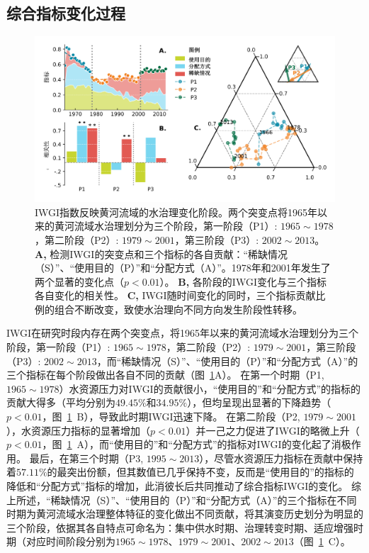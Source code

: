 \subsection{综合指标变化过程}\label{ch4:sec:process}

\begin{figure}[ht!]
	\centering
	\includegraphics[width=\textwidth]{img/ch4/ch4_index.png}
	\caption[IWGI指数反映黄河流域的水治理变化阶段]{IWGI指数反映黄河流域的水治理变化阶段。两个突变点将1965年以来的黄河流域水治理划分为三个阶段，第一阶段（P1）: $1965 \sim 1978$，第二阶段（P2）: $1979 \sim 2001$，第三阶段（P3）: $2002 \sim 2013$。
	\textbf{A,} 检测IWGI的突变点和三个指标的各自贡献：“稀缺情况（S）”、“使用目的（P）”和“分配方式（A）”。1978年和2001年发生了两个显著的变化点（$p<0.01$）。
	\textbf{B,}  各阶段的IWGI变化与三个指标各自变化的相关性。
	\textbf{C,} IWGI随时间变化的同时，三个指标贡献比例的组合不断改变，致使水治理向不同方向发生阶段性转移。
	}\label{ch4:fig:IWGI}
\end{figure}

IWGI在研究时段内存在两个突变点，将1965年以来的黄河流域水治理划分为三个阶段，第一阶段（P1）: $1965 \sim 1978$，第二阶段（P2）: $1979 \sim 2001$，第三阶段（P3）: $2002 \sim 2013$，而“稀缺情况（S）”、“使用目的（P）”和“分配方式（A）”的三个指标在每个阶段做出各自不同的贡献（图~\ref{ch4:fig:IWGI}A）。
在第一个时期（P1, $1965 \sim 1978$）水资源压力对IWGI的贡献很小，“使用目的”和“分配方式”的指标的贡献大得多（平均分别为$49.45\%$和$34.95\%$），但均呈现出显著的下降趋势（$p<0.01$，图~\ref{ch4:fig:IWGI}~B），导致此时期IWGI迅速下降。
在第二阶段（P2, $1979 \sim 2001$），水资源压力指标的显著增加（$p<0.01$）并一己之力促进了IWGI的略微上升（$p<0.01$，图~\ref{ch4:fig:IWGI}~A），而“使用目的”和“分配方式”的指标对IWGI的变化起了消极作用。
最后，在第三个时期（P3, $1995 \sim 2013$），尽管水资源压力指标在贡献中保持着$57.11\%$的最突出份额，但其数值已几乎保持不变，反而是“使用目的”的指标的降低和“分配方式”指标的增加，此消彼长后共同推动了综合指标IWGI的变化。
综上所述，“稀缺情况（S）”、“使用目的（P）”和“分配方式（A）”的三个指标在不同时期为黄河流域水治理整体特征的变化做出不同贡献，将其演变历史划分为明显的三个阶段，依据其各自特点可命名为：集中供水时期、治理转变时期、适应增强时期（对应时间阶段分别为$1965 \sim 1978$、$1979 \sim 2001$、$2002 \sim 2013$（图~\ref{ch4:fig:IWGI}~C）。

